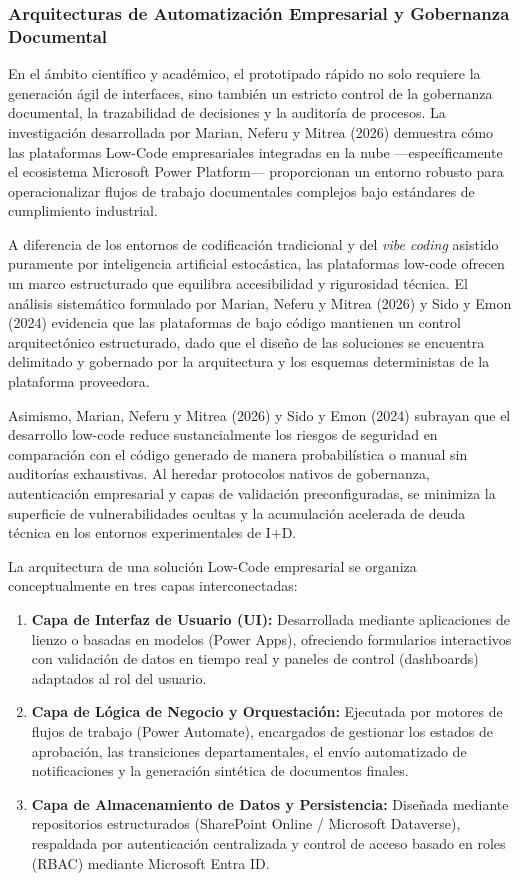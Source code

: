\subsubsection{Arquitecturas de Automatización Empresarial y Gobernanza Documental}

En el ámbito científico y académico, el prototipado rápido no solo requiere la generación ágil de interfaces, sino también un estricto control de la gobernanza documental, la trazabilidad de decisiones y la auditoría de procesos. La investigación desarrollada por Marian, Neferu y Mitrea (2026) demuestra cómo las plataformas Low-Code empresariales integradas en la nube ---específicamente el ecosistema Microsoft Power Platform--- proporcionan un entorno robusto para operacionalizar flujos de trabajo documentales complejos bajo estándares de cumplimiento industrial.

A diferencia de los entornos de codificación tradicional y del \textit{vibe coding} asistido puramente por inteligencia artificial estocástica, las plataformas low-code ofrecen un marco estructurado que equilibra accesibilidad y rigurosidad técnica. El análisis sistemático formulado por Marian, Neferu y Mitrea (2026) y Sido y Emon (2024) evidencia que las plataformas de bajo código mantienen un control arquitectónico estructurado, dado que el diseño de las soluciones se encuentra delimitado y gobernado por la arquitectura y los esquemas deterministas de la plataforma proveedora.

Asimismo, Marian, Neferu y Mitrea (2026) y Sido y Emon (2024) subrayan que el desarrollo low-code reduce sustancialmente los riesgos de seguridad en comparación con el código generado de manera probabilística o manual sin auditorías exhaustivas. Al heredar protocolos nativos de gobernanza, autenticación empresarial y capas de validación preconfiguradas, se minimiza la superficie de vulnerabilidades ocultas y la acumulación acelerada de deuda técnica en los entornos experimentales de I+D.

La arquitectura de una solución Low-Code empresarial se organiza conceptualmente en tres capas interconectadas:

\begin{enumerate}
    \item \textbf{Capa de Interfaz de Usuario (UI):} Desarrollada mediante aplicaciones de lienzo o basadas en modelos (Power Apps), ofreciendo formularios interactivos con validación de datos en tiempo real y paneles de control (dashboards) adaptados al rol del usuario.
    \item \textbf{Capa de Lógica de Negocio y Orquestación:} Ejecutada por motores de flujos de trabajo (Power Automate), encargados de gestionar los estados de aprobación, las transiciones departamentales, el envío automatizado de notificaciones y la generación sintética de documentos finales.
    \item \textbf{Capa de Almacenamiento de Datos y Persistencia:} Diseñada mediante repositorios estructurados (SharePoint Online / Microsoft Dataverse), respaldada por autenticación centralizada y control de acceso basado en roles (RBAC) mediante Microsoft Entra ID.
\end{enumerate}


